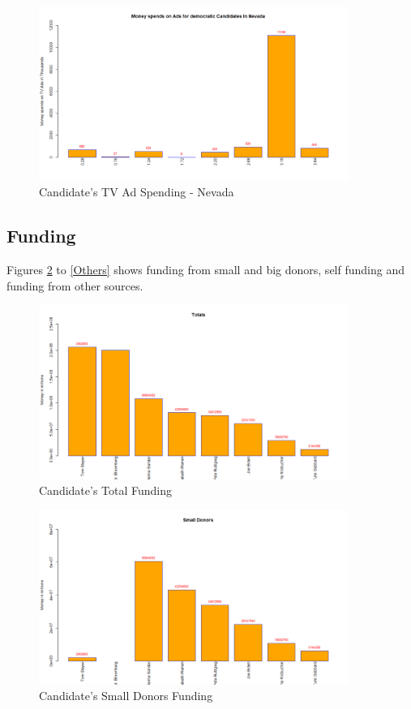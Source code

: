 \begin{figure}[H]
    \centering
    \includegraphics[width=0.9\textwidth]{figures/Nevada.png}
    \caption{Candidate's TV Ad Spending - Nevada}
    \label{Nevada}
\end{figure}

\subsection{Funding}

Figures \ref{Total} to \ref{Others} shows funding from small and big donors,  self funding and funding from other sources.

\begin{figure}[H]
    \centering
    \includegraphics[width=0.9\textwidth]{figures/Total.png}
    \caption{Candidate's Total Funding}
    \label{Total}
\end{figure}

\begin{figure}[H]
    \centering
    \includegraphics[width=0.9\textwidth]{figures/Small Donors.png}
    \caption{Candidate's Small Donors Funding}
    \label{Small Donors}
\end{figure}

